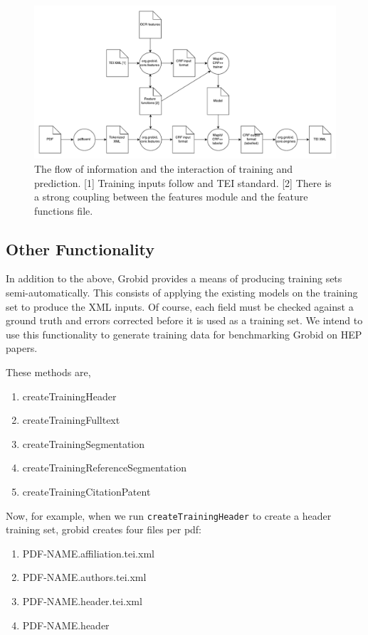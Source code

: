 \documentclass[11pt, oneside]{scrartcl}   	%
\begin{document}
\begin{figure}[!ht]
\center
\includegraphics[width=7in]{figures/grobid.pdf}
\caption{The flow of information and the interaction of training and prediction. [1] Training inputs follow and TEI standard. [2] There is a strong coupling between the features module and the feature functions file.}
\label{fig:flow}
\end{figure}

\subsection{Other Functionality}

In addition to the above, Grobid provides a means of producing training sets semi-automatically. This consists of applying the existing models on the training set to produce the XML inputs. Of course, each field must be checked against a ground truth and errors corrected before it is used as a training set. We intend to use this functionality to generate training data for benchmarking Grobid on HEP papers.

These methods are,

\begin{enumerate}
\item createTrainingHeader
\item createTrainingFulltext
\item createTrainingSegmentation
\item createTrainingReferenceSegmentation
\item createTrainingCitationPatent
\end{enumerate}

Now, for example, when we run \texttt{createTrainingHeader} to create a header training set, grobid creates four files per pdf:

\begin{enumerate}
\item PDF-NAME.affiliation.tei.xml
\item PDF-NAME.authors.tei.xml
\item PDF-NAME.header.tei.xml
\item PDF-NAME.header
\end{enumerate}
\end{document}

